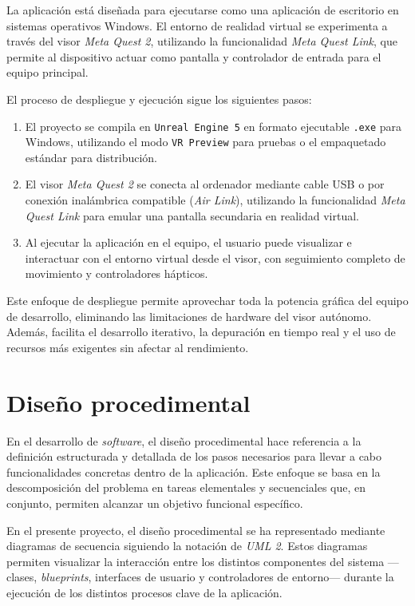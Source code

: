 La aplicación está diseñada para ejecutarse como una aplicación de escritorio en sistemas operativos Windows. El entorno de realidad virtual se experimenta a través del visor \textit{Meta Quest 2}, utilizando la funcionalidad \textit{Meta Quest Link}, que permite al dispositivo actuar como pantalla y controlador de entrada para el equipo principal.

El proceso de despliegue y ejecución sigue los siguientes pasos:

\begin{enumerate}
  \item El proyecto se compila en \texttt{Unreal Engine 5} en formato ejecutable \texttt{.exe} para Windows, utilizando el modo \texttt{VR Preview} para pruebas o el empaquetado estándar para distribución.
  \item El visor \textit{Meta Quest 2} se conecta al ordenador mediante cable USB o por conexión inalámbrica compatible (\textit{Air Link}), utilizando la funcionalidad \textit{Meta Quest Link} para emular una pantalla secundaria en realidad virtual.
  \item Al ejecutar la aplicación en el equipo, el usuario puede visualizar e interactuar con el entorno virtual desde el visor, con seguimiento completo de movimiento y controladores hápticos.
\end{enumerate}

Este enfoque de despliegue permite aprovechar toda la potencia gráfica del equipo de desarrollo, eliminando las limitaciones de hardware del visor autónomo. Además, facilita el desarrollo iterativo, la depuración en tiempo real y el uso de recursos más exigentes sin afectar al rendimiento.

\section{Diseño procedimental}

En el desarrollo de \textit{software}, el diseño procedimental hace referencia a la definición estructurada y detallada de los pasos necesarios para llevar a cabo funcionalidades concretas dentro de la aplicación. Este enfoque se basa en la descomposición del problema en tareas elementales y secuenciales que, en conjunto, permiten alcanzar un objetivo funcional específico.

En el presente proyecto, el diseño procedimental se ha representado mediante diagramas de secuencia siguiendo la notación de \textit{UML 2}. Estos diagramas permiten visualizar la interacción entre los distintos componentes del sistema —clases, \textit{blueprints}, interfaces de usuario y controladores de entorno— durante la ejecución de los distintos procesos clave de la aplicación.

